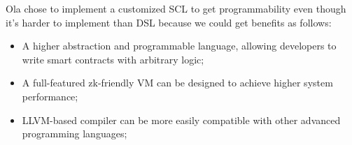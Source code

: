 Ola chose to implement a customized SCL to get programmability even though it's harder to implement than DSL because we could get benefits as follows:
 \begin{itemize}
 \item A higher abstraction and programmable language, allowing developers to write smart contracts with arbitrary logic;
 \item A full-featured zk-friendly VM can be designed to achieve higher system performance;
 \item LLVM-based compiler can be more easily compatible with other advanced programming languages;
\end{itemize}
